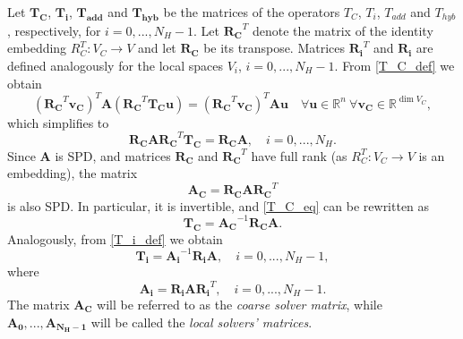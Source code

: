 \documentclass[11pt]{article}
\theoremstyle{definition}
\theoremstyle{theorem}
\begin{document}
Let $\bm{T_C}$, $\bm{T_i}$, $\bm{T_{add}}$ and $\bm{T_{hyb}}$ be the matrices of the
operators $T_C$, $T_i$, $T_{add}$ and $T_{hyb}$, respectively, for ${i=0,...,{N_H-1}}$.
Let $\bm{R_C}^T$ denote the matrix of the identity embedding $R_C^T: V_C \to V$
and let $\bm{R_C}$ be its transpose. Matrices
$\bm{R_i}^T$ and $\bm{R_i}$ are defined analogously for the local spaces $V_i$,
$i=0,...,N_H-1$. From \eqref{T_C_def} we obtain
\[
\left(\bm{R_C}^T\bm{v_C}\right)^T \bm{A} \left(\bm{R_C}^T\bm{T_C}\bm{u}\right)
  = \left(\bm{R_C}^T\bm{v_C}\right)^T \bm{A} \bm{u}
\quad \forall \bm{u}\in \mathbb{R}^n\ \forall \bm{v_C}\in \mathbb{R}^{\dim V_C},
\]
which simplifies to
\begin{equation}
\bm{R_C} \bm{A} \bm{R_C}^T \bm{T_C} = \bm{R_C} \bm{A},\quad i=0,...,N_H.\label{T_C_eq}
\end{equation}
Since $\bm{A}$ is SPD, and matrices $\bm{R_C}$ and $\bm{R_C}^T$ have full rank
(as $R_C^T:V_C\to V$ is an embedding), the matrix
\begin{equation}
\bm{A_C} = \bm{R_C} \bm{A} \bm{R_C}^T\label{A_C_def}
\end{equation}
is also SPD. In particular, it is invertible, and
\eqref{T_C_eq} can be rewritten as
\begin{equation}
\bm{T_C} = \bm{A_C}^{-1}\bm{R_C}\bm{A}.\label{T_C_matrix}
\end{equation}
Analogously, from \eqref{T_i_def} we obtain
\begin{equation}
\bm{T_i} = \bm{A_i}^{-1}\bm{R_i}\bm{A},\quad i=0,...,N_H-1,\label{T_i_matrix}
\end{equation}
where
\begin{equation}
\bm{A_i} = \bm{R_i} \bm{A} \bm{R_i}^T,\quad i = 0, ..., N_H - 1.\label{A_i_def}
\end{equation}
The matrix $\bm{A_C}$ will be referred to as the \emph{coarse solver matrix},
while $\bm{A_0}, ..., \bm{A_{N_H-1}}$ will be called the \emph{local solvers' matrices}.
\end{document}
